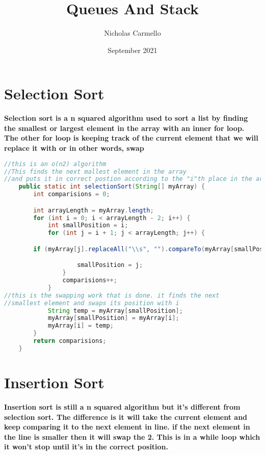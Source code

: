 \documentclass{article}
\begin{document}
\title{Queues And Stack}
\author{Nicholas Carmello}
\date{September 2021}
\section{Selection Sort}
\textbf{Selection sort is a n squared algorithm used to sort a list by finding the smallest or largest element in the array with an inner for loop. The other for loop is keeping track of the current element that we will replace it with or in other words, swap}
\begin{lstlisting}[language = java]
//this is an o(n2) algorithm
//This finds the next mallest element in the array 
//and puts it in correct postion according to the "i"th place in the array.
    public static int selectionSort(String[] myArray) {
        int comparisions = 0;

        int arrayLength = myArray.length;
        for (int i = 0; i < arrayLength - 2; i++) {
            int smallPosition = i;
            for (int j = i + 1; j < arrayLength; j++) {

        if (myArray[j].replaceAll("\\s", "").compareTo(myArray[smallPosition].replaceAll("\\s", "")) < 0) {

                    smallPosition = j;
                }
                comparisions++;
            }
//this is the swapping work that is done. it finds the next
//smallest element and swaps its position with i 
            String temp = myArray[smallPosition];
            myArray[smallPosition] = myArray[i];
            myArray[i] = temp;
        }
        return comparisions;
    }
\end{lstlisting}
\section{Insertion Sort}

\textbf{Insertion sort is still a n squared algorithm but it's different from selection sort. The difference is it will take the current element and keep comparing it to the next element in line. if the next element in the line is smaller then it will swap the 2. This is in a while loop which it won't stop until it's in the correct position.}
\end{document}

